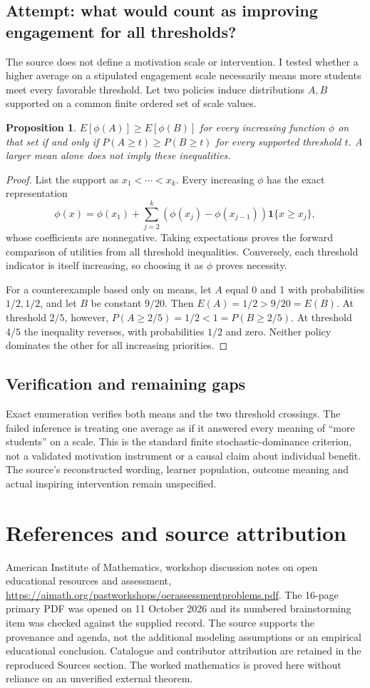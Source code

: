 \documentclass[11pt]{article}
\newtheorem{proposition}{Proposition}
\begin{document}
\subsection{Attempt: what would count as improving engagement for all thresholds?}
The source does not define a motivation scale or intervention. I tested whether a higher average on a stipulated engagement scale necessarily means more students meet every favorable threshold. Let two policies induce distributions $A,B$ supported on a common finite ordered set of scale values.
\begin{proposition}
$E[\phi(A)]\ge E[\phi(B)]$ for every increasing function $\phi$ on that set if and only if $P(A\ge t)\ge P(B\ge t)$ for every supported threshold $t$. A larger mean alone does not imply these inequalities.
\end{proposition}
\begin{proof}
List the support as $x_1<\cdots<x_k$. Every increasing $\phi$ has the exact representation
\[
\phi(x)=\phi(x_1)+\sum_{j=2}^k(\phi(x_j)-\phi(x_{j-1}))\mathbf1\{x\ge x_j\},
\]
whose coefficients are nonnegative. Taking expectations proves the forward comparison of utilities from all threshold inequalities. Conversely, each threshold indicator is itself increasing, so choosing it as $\phi$ proves necessity.

For a counterexample based only on means, let $A$ equal 0 and 1 with probabilities $1/2,1/2$, and let $B$ be constant $9/20$. Then $E(A)=1/2>9/20=E(B)$. At threshold $2/5$, however, $P(A\ge2/5)=1/2<1=P(B\ge2/5)$. At threshold $4/5$ the inequality reverses, with probabilities $1/2$ and zero. Neither policy dominates the other for all increasing priorities.
\end{proof}
\subsection{Verification and remaining gaps}
Exact enumeration verifies both means and the two threshold crossings. The failed inference is treating one average as if it answered every meaning of ``more students'' on a scale. This is the standard finite stochastic-dominance criterion, not a validated motivation instrument or a causal claim about individual benefit. The source's reconstructed wording, learner population, outcome meaning and actual inspiring intervention remain unspecified.

\section{References and source attribution}
American Institute of Mathematics, workshop discussion notes on open educational resources and assessment, \url{https://aimath.org/pastworkshops/oerassessmentproblems.pdf}. The 16-page primary PDF was opened on 11 October 2026 and its numbered brainstorming item was checked against the supplied record. The source supports the provenance and agenda, not the additional modeling assumptions or an empirical educational conclusion. Catalogue and contributor attribution are retained in the reproduced Sources section. The worked mathematics is proved here without reliance on an unverified external theorem.
\end{document}
